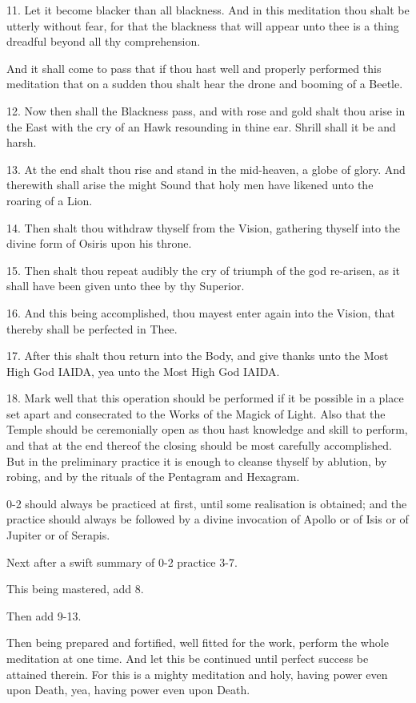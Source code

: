 11. Let it become blacker than all blackness. And in this meditation thou shalt be utterly without fear, for that the blackness that will appear unto thee is a thing dreadful beyond all thy comprehension.

And it shall come to pass that if thou hast well and properly performed this meditation that on a sudden thou shalt hear the drone and booming of a Beetle.

12. Now then shall the Blackness pass, and with rose and gold shalt thou arise in the East with the cry of an Hawk resounding in thine ear. Shrill shall it be and harsh.

13. At the end shalt thou rise and stand in the mid-heaven, a globe of glory. And therewith shall arise the might Sound that holy men have likened unto the roaring of a Lion.

14. Then shalt thou withdraw thyself from the Vision, gathering thyself into the divine form of Osiris upon his throne.

15. Then shalt thou repeat audibly the cry of triumph of the god re-arisen, as it shall have been given unto thee by thy Superior.

16. And this being accomplished, thou mayest enter again into the Vision, that thereby shall be perfected in Thee.

17. After this shalt thou return into the Body, and give thanks unto the Most High God IAIDA, yea unto the Most High God IAIDA.

18. Mark well that this operation should be performed if it be possible in a place set apart and consecrated to the Works of the Magick of Light. Also that the Temple should be ceremonially open as thou hast knowledge and skill to perform, and that at the end thereof the closing should be most carefully accomplished. But in the preliminary practice it is enough to cleanse thyself by ablution, by robing, and by the rituals of the Pentagram and Hexagram.

0-2 should always be practiced at first, until some realisation is obtained; and the practice should always be followed by a divine invocation of Apollo or of Isis or of Jupiter or of Serapis.

Next after a swift summary of 0-2 practice 3-7.

This being mastered, add 8.

Then add 9-13.

Then being prepared and fortified, well fitted for the work, perform the whole meditation at one time. And let this be continued until perfect success be attained therein. For this is a mighty meditation and holy, having power even upon Death, yea, having power even upon Death.

